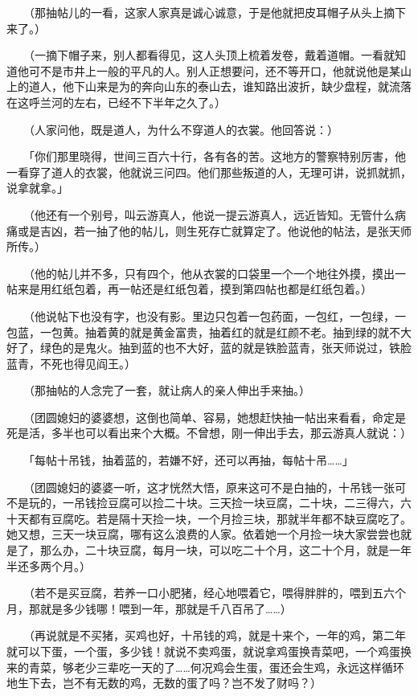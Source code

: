 \documentclass[UTF8]{ctexart}
\begin{document}
　　（那抽帖儿的一看，这家人家真是诚心诚意，于是他就把皮耳帽子从头上摘下来了。）

　　（一摘下帽子来，别人都看得见，这人头顶上梳着发卷，戴着道帽。一看就知道他可不是市井上一般的平凡的人。别人正想要问，还不等开口，他就说他是某山上的道人，他下山来是为的奔向山东的泰山去，谁知路出波折，缺少盘程，就流落在这呼兰河的左右，已经不下半年之久了。）

　　（人家问他，既是道人，为什么不穿道人的衣裳。他回答说：）

　　「你们那里晓得，世间三百六十行，各有各的苦。这地方的警察特别厉害，他一看穿了道人的衣裳，他就说三问四。他们那些叛道的人，无理可讲，说抓就抓，说拿就拿。」

　　（他还有一个别号，叫云游真人，他说一提云游真人，远近皆知。无管什么病痛或是吉凶，若一抽了他的帖儿，则生死存亡就算定了。他说他的帖法，是张天师所传。）

　　（他的帖儿并不多，只有四个，他从衣裳的口袋里一个一个地往外摸，摸出一帖来是用红纸包着，再一帖还是红纸包着，摸到第四帖也都是红纸包着。）

　　（他说帖下也没有字，也没有影。里边只包着一包药面，一包红，一包绿，一包蓝，一包黄。抽着黄的就是黄金富贵，抽着红的就是红颜不老。抽到绿的就不大好了，绿色的是鬼火。抽到蓝的也不大好，蓝的就是铁脸蓝青，张天师说过，铁脸蓝青，不死也得见阎王。）

　　（那抽帖的人念完了一套，就让病人的亲人伸出手来抽。）

　　（团圆媳妇的婆婆想，这倒也简单、容易，她想赶快抽一帖出来看看，命定是死是活，多半也可以看出来个大概。不曾想，刚一伸出手去，那云游真人就说：）

　　「每帖十吊钱，抽着蓝的，若嫌不好，还可以再抽，每帖十吊……」

　　（团圆媳妇的婆婆一听，这才恍然大悟，原来这可不是白抽的，十吊钱一张可不是玩的，一吊钱捡豆腐可以捡二十块。三天捡一块豆腐，二十块，二三得六，六十天都有豆腐吃。若是隔十天捡一块，一个月捡三块，那就半年都不缺豆腐吃了。她又想，三天一块豆腐，哪有这么浪费的人家。依着她一个月捡一块大家尝尝也就是了，那么办，二十块豆腐，每月一块，可以吃二十个月，这二十个月，就是一年半还多两个月。）

　　（若不是买豆腐，若养一口小肥猪，经心地喂着它，喂得胖胖的，喂到五六个月，那就是多少钱哪！喂到一年，那就是千八百吊了……）

　　（再说就是不买猪，买鸡也好，十吊钱的鸡，就是十来个，一年的鸡，第二年就可以下蛋，一个蛋，多少钱！就说不卖鸡蛋，就说拿鸡蛋换青菜吧，一个鸡蛋换来的青菜，够老少三辈吃一天的了……何况鸡会生蛋，蛋还会生鸡，永远这样循环地生下去，岂不有无数的鸡，无数的蛋了吗？岂不发了财吗？）
\end{document}
